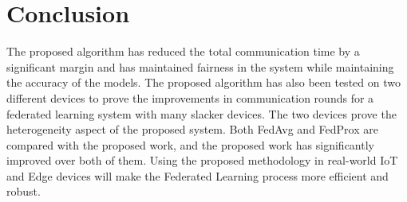 \documentclass[conference]{IEEEtran}
\begin{document}
\section{Conclusion}
The proposed algorithm has reduced the total communication time by a significant margin and has maintained fairness in the system while maintaining the accuracy of the models. The proposed algorithm has also been tested on two different devices to prove the improvements in communication rounds for a federated learning system with many slacker devices. The two devices prove the heterogeneity aspect of the proposed system. Both FedAvg and FedProx are compared with the proposed work, and the proposed work has significantly improved over both of them. Using the proposed methodology in real-world IoT and Edge devices will make the Federated Learning process more efficient and robust.


\end{document}
